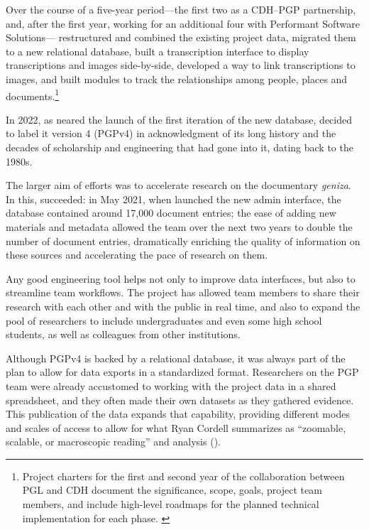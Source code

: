 \documentclass{article}
\begin{document}
Over the course of a five-year period—the first two as a CDH–PGP partnership, and, after the first year, working for an additional four with Performant Software Solutions— restructured and combined the existing project data, migrated them to a new relational database, built a transcription interface to display transcriptions and images side-by-side, developed a way to link transcriptions to images, and built modules to track the relationships among people, places and documents.\footnote{ Project charters for the first and second year of the collaboration between PGL and CDH document the significance, scope, goals, project team members, and include high-level roadmaps for the planned technical implementation for each phase. \autocite{budak_cdh_2020, rustow_cdh_2022} } 

In 2022, as  neared the launch of the first iteration of the new database,  decided to label it version 4 (PGPv4) in acknowledgment of its long history and the decades of scholarship and engineering that had gone into it, dating back to the 1980s.

The larger aim of  efforts was to accelerate research on the documentary \textit{geniza}. In this,  succeeded: in May 2021, when  launched the new admin interface, the database contained around 17,000 document entries; the ease of adding new materials and metadata allowed the team over the next two years to double the number of document entries, dramatically enriching the quality of information on these sources and accelerating the pace of research on them.

Any good engineering tool helps not only to improve data interfaces, but also to streamline team workflows. The project has allowed team members to share their research with each other and with the public in real time, and also to expand the pool of researchers to include undergraduates and even some high school students, as well as colleagues from other institutions. 

Although PGPv4 is backed by a relational database, it was always part of the plan to allow for data exports in a standardized format. Researchers on the PGP team were already accustomed to working with the project data in a shared spreadsheet, and they often made their own datasets as they gathered evidence. This publication of the data expands that capability, providing different modes and scales of access to allow for what Ryan Cordell summarizes as “zoomable, scalable, or macroscopic reading” and analysis (\citeyear{cordell_what_2017}).
\end{document}
